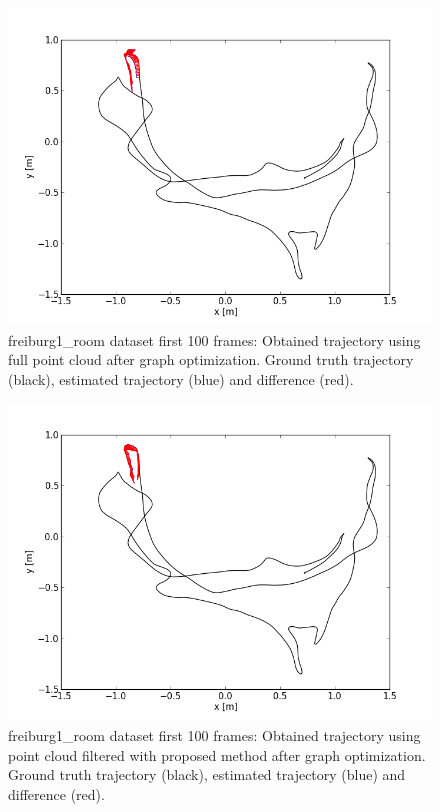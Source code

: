 \begin{figure}[H]
\begin{center}
\includegraphics[scale=0.75]{images/freiburg1_room_1_100_fullcloud_optimized.png}
\caption{freiburg1\_room dataset first 100 frames: Obtained trajectory using full point cloud after graph optimization. Ground truth trajectory (black), estimated trajectory (blue) and difference (red).}
\label{fig:jan}
\end{center}
\end{figure}

\begin{figure}[H]
\begin{center}
\includegraphics[scale=0.75]{images/freiburg1_room_1_100_optimized.png}
\caption{freiburg1\_room dataset first 100 frames: Obtained trajectory using point cloud filtered with proposed method after graph optimization. Ground truth trajectory (black), estimated trajectory (blue) and difference (red).}
\label{fig:jan}
\end{center}
\end{figure}

